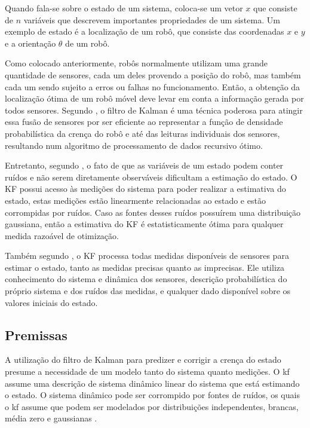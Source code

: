\documentclass[acronym, symbols, table]{fei}
\begin{document}
			Quando fala-se sobre o estado de um sistema, coloca-se um vetor $x$ que consiste de $n$ variáveis que descrevem importantes propriedades de um sistema. Um exemplo de estado é a localização de um robô, que consiste das coordenadas $x$ e $y$ e a orientação $\theta$ de um robô.
			
			Como colocado anteriormente, robôs normalmente utilizam uma grande quantidade de sensores, cada um deles provendo a posição do robô, mas também cada um sendo sujeito a erros ou falhas no funcionamento. Então, a obtenção da localização ótima de um robô móvel deve levar em conta a informação gerada por todos sensores. Segundo \textcite{siegwart2011introduction}, o filtro de Kalman é uma técnica poderosa para atingir essa fusão de sensores por ser eficiente ao representar a função de densidade probabilística da crença do robô e até das leituras individuais dos sensores, resultando num algoritmo de processamento de dados recursivo ótimo.
			
			Entretanto, segundo \textcite{phdthesisNegenborn}, o fato de que as variáveis de um estado podem conter ruídos e não serem diretamente observáveis dificultam a estimação do estado. O KF possui acesso às medições do sistema para poder realizar a estimativa do estado, estas medições estão linearmente relacionadas ao estado e estão corrompidas por ruídos. Caso as fontes desses ruídos possuírem uma distribuição gaussiana, então a estimativa do KF é estatisticamente ótima para qualquer medida razoável de otimização.
			
			Também segundo \textcite{phdthesisNegenborn}, o KF processa todas medidas disponíveis de sensores para estimar o estado, tanto as medidas precisas quanto as imprecisas. Ele utiliza conhecimento do sistema e dinâmica dos sensores, descrição probabilística do próprio sistema e dos ruídos das medidas, e qualquer dado disponível sobre os valores iniciais do estado.
			
		\subsection{Premissas}
		
			A utilização do filtro de Kalman para predizer e corrigir a crença do estado presume a necessidade de um modelo tanto do sistema quanto medições. O \acrshort{kf} assume uma descrição de sistema dinâmico linear do sistema que está estimando o estado. O sistema dinâmico pode ser corrompido por fontes de ruídos, os quais o \acrshort{kf} assume que podem ser modelados por distribuições independentes, brancas, média zero e gaussianas \cite{urrea2021kalman}.
			
\end{document}
